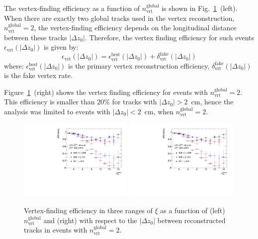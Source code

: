 The vertex-finding efficiency as a function of $n^\textrm{global}_\textrm{vrt}$ is shown in  Fig.~\ref{fig:vertexEffi}~(left). When there are exactly two global tracks used in the vertex reconstruction, $n^\textrm{global}_\textrm{vrt}=2$, the vertex-finding efficiency depends on the longitudinal distance between these tracks $|\Delta z_0|$. Therefore, the vertex finding efficiency for such events $\epsilon_\textrm{vrt}\left(|\Delta z_0|\right)$ is given by:
\begin{equation}
\epsilon_\textrm{vrt}\left(|\Delta z_0|\right)=\epsilon_\textrm{vrt}^\textrm{best}\left(|\Delta z_0|\right)+\delta_\textrm{vrt}^\textrm{fake}\left(|\Delta z_0|\right)
\end{equation}
where: $\epsilon_\textrm{vrt}^\textrm{best}\left(|\Delta z_0|\right)$ is the primary vertex reconstruction efficiency, $\delta_\textrm{vrt}^\textrm{fake}\left(|\Delta z_0|\right)$ is the fake vertex rate.

Figure~\ref{fig:vertexEffi}~(right) shows the vertex finding efficiency for events with $n^\textrm{global}_\textrm{vrt}=2$. This efficiency is smaller than $20\%$ for tracks with $|\Delta z_0|>2$~cm, hence the analysis was limited to  events with  $|\Delta z_0|<2$~cm, when $n^\textrm{global}_\textrm{vrt}=2$. 
\begin{figure}[h!]
	\centering
		\includegraphics[width=0.49\textwidth,page=1]{chapters/chrgSTAR/img/vertex/vertexEffi_ksi.pdf}
		\includegraphics[width=0.49\textwidth,page=8]{chapters/chrgSTAR/img/vertex/vertexEffi_ksi.pdf}
		\caption{Vertex-finding efficiency in three ranges of $\xi$ as a function of  (left) $n^\textrm{global}_\textrm{vrt}$ and (right) with respect to the $|\Delta z_0|$ between reconstructed tracks in events with $n^\textrm{global}_\textrm{vrt}=2$. }
		\label{fig:vertexEffi}
\end{figure}


